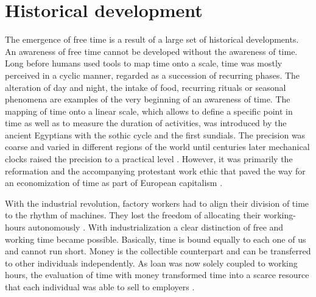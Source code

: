 \documentclass[12pt,numbers=noenddot,parskip,bibliography=totocnumbered,listof=totocnumbered,draft]{scrreprt}
\begin{document}
\section{Historical development}
The emergence of free time is a result of a large set of historical developments. An awareness of free time cannot be developed without the awareness of time. Long before humans used tools to map time onto a scale, time was mostly perceived in a cyclic manner, regarded as a succession of recurring phases. The alteration of day and night, the intake of food, recurring rituals or seasonal phenomena are examples of the very beginning of an awareness of time. The mapping of time onto a linear scale, which allows to define a specific point in time as well as to measure the duration of activities, was introduced by the ancient Egyptians with the sothic cycle and the first sundials. \citep[p.25-27]{whitrow1989} The precision was coarse and varied in different regions of the world until centuries later mechanical clocks raised the precision to a practical level \citep[p.103]{whitrow1989}. However, it was primarily the reformation and the accompanying protestant work ethic that paved the way for an economization of time as part of European capitalism \citep[p.22]{weber2006}.

With the industrial revolution, factory workers had to align their division of time to the rhythm of machines. They lost the freedom of allocating their working-hours autonomously \citep[p.160]{whitrow1989}. With industrialization a clear distinction of free and working time became possible. Basically, time is bound equally to each one of us and cannot run short. Money is the collectible counterpart and can be transferred to other individuals independently. As loan was now solely coupled to working hours, the evaluation of time with money transformed time into a scarce resource that each individual was able to sell to employers \citep[p.54]{marx1867}.
\end{document}
